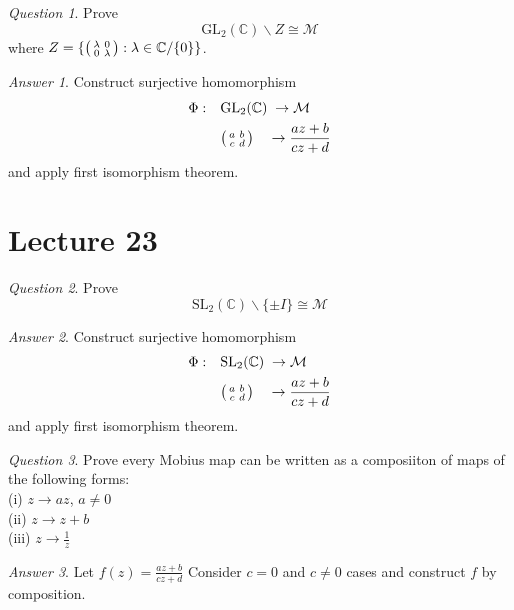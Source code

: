 \documentclass[]{article}
\def\complex{\mathbb{C}}
\def\mobius{\mathcal{M}}
\newenvironment{psmallmatrix}
  {\left(\begin{smallmatrix}}
  {\end{smallmatrix}\right)}
\theoremstyle{remark}
\theoremstyle{qnstyle}
\newtheorem{question}{Question}
\theoremstyle{answerstyle}
\newtheorem*{answer}{Answer}
\begin{document}
\begin{question}
    Prove 
        $$\text{GL}_2 (\complex)\backslash Z \cong \mobius$$
    where $Z = \{ \begin{psmallmatrix}
        \lambda & 0 \\
        0 & \lambda
    \end{psmallmatrix}: \lambda \in \complex / \{0\}\}$.
\end{question}
\begin{answer}
    Construct surjective homomorphism
    \begin{align*}
        \Phi: \quad & \text{GL}_2(\complex) \; \to \mobius \\
        & \begin{psmallmatrix} 
            a & b \\ 
            c & d 
        \end{psmallmatrix} \quad  \to \frac{az+b}{cz+d}
    \end{align*}
    and apply first isomorphism theorem.
\end{answer}






\section* {Lecture 23}

\begin{question}
    Prove 
        $$\text{SL}_2 (\complex)\backslash \{\pm I\} \cong \mobius$$
\end{question}
\begin{answer}
    Construct surjective homomorphism
    \begin{align*}
        \Phi: \quad & \text{SL}_2(\complex) \; \to \mobius \\
        & \begin{psmallmatrix} 
            a & b \\ 
            c & d 
        \end{psmallmatrix} \quad  \to \frac{az+b}{cz+d}
    \end{align*}
    and apply first isomorphism theorem.
\end{answer}

\begin{question}
    Prove every Mobius map can be written as a composiiton of maps of the following
    forms: \\
    (i) $z \to az$, $a \not = 0$ \\
    (ii) $z \to z + b$ \\
    (iii) $z \to \frac{1}{z}$
\end{question}
\begin{answer}
    Let $f(z) = \frac{az+b}{cz+d}$
    Consider $c = 0$ and $c \not = 0$ cases and construct $f$ by composition.
\end{answer}
\end{document}
